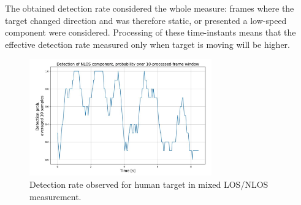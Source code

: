 The obtained detection rate considered the whole measure: frames where the target changed direction and was therefore static, or presented a low-speed component were considered. Processing of these time-instants means that the effective detection rate measured only when target is moving will be higher.

\begin{figure}[H]
	\centering
	\includegraphics[width=0.7\textwidth]{Images/Test1/moving_avg.png}
	\caption{Detection rate observed for human target in mixed LOS/NLOS measurement.}
	\label{fig:Test1_moving_avg}
\end{figure}


